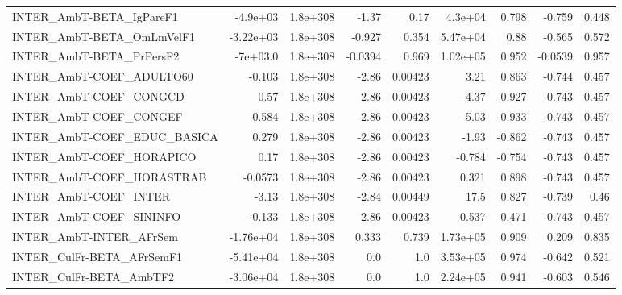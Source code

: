 \begin{tabular}{lrrrrrrrr}
INTER\_AmbT-BETA\_IgPareF1              &    -4.9e+03 &     1.8e+308 &   -1.37 &     0.17 &    4.3e+04 &       0.798 &       -0.759 &         0.448 \\
INTER\_AmbT-BETA\_OmLmVelF1             &   -3.22e+03 &     1.8e+308 &  -0.927 &    0.354 &   5.47e+04 &        0.88 &       -0.565 &         0.572 \\
INTER\_AmbT-BETA\_PrPersF2              &    -7e+03.0 &     1.8e+308 & -0.0394 &    0.969 &   1.02e+05 &       0.952 &      -0.0539 &         0.957 \\
INTER\_AmbT-COEF\_ADULTO60              &      -0.103 &     1.8e+308 &   -2.86 &  0.00423 &       3.21 &       0.863 &       -0.744 &         0.457 \\
INTER\_AmbT-COEF\_CONGCD                &        0.57 &     1.8e+308 &   -2.86 &  0.00423 &      -4.37 &      -0.927 &       -0.743 &         0.457 \\
INTER\_AmbT-COEF\_CONGEF                &       0.584 &     1.8e+308 &   -2.86 &  0.00423 &      -5.03 &      -0.933 &       -0.743 &         0.457 \\
INTER\_AmbT-COEF\_EDUC\_BASICA           &       0.279 &     1.8e+308 &   -2.86 &  0.00423 &      -1.93 &      -0.862 &       -0.743 &         0.457 \\
INTER\_AmbT-COEF\_HORAPICO              &        0.17 &     1.8e+308 &   -2.86 &  0.00423 &     -0.784 &      -0.754 &       -0.743 &         0.457 \\
INTER\_AmbT-COEF\_HORASTRAB             &     -0.0573 &     1.8e+308 &   -2.86 &  0.00423 &      0.321 &       0.898 &       -0.743 &         0.457 \\
INTER\_AmbT-COEF\_INTER                 &       -3.13 &     1.8e+308 &   -2.84 &  0.00449 &       17.5 &       0.827 &       -0.739 &          0.46 \\
INTER\_AmbT-COEF\_SININFO               &      -0.133 &     1.8e+308 &   -2.86 &  0.00423 &      0.537 &       0.471 &       -0.743 &         0.457 \\
INTER\_AmbT-INTER\_AFrSem               &   -1.76e+04 &     1.8e+308 &   0.333 &    0.739 &   1.73e+05 &       0.909 &        0.209 &         0.835 \\
INTER\_CulFr-BETA\_AFrSemF1             &   -5.41e+04 &     1.8e+308 &     0.0 &      1.0 &   3.53e+05 &       0.974 &       -0.642 &         0.521 \\
INTER\_CulFr-BETA\_AmbTF2               &   -3.06e+04 &     1.8e+308 &     0.0 &      1.0 &   2.24e+05 &       0.941 &       -0.603 &         0.546 \\

\end{tabular}
